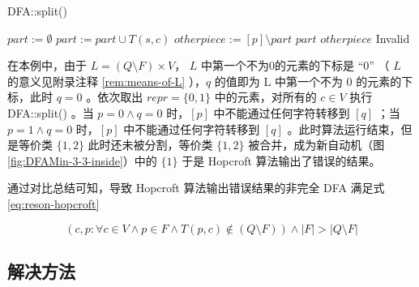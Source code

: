 \begin{algorithm}
    \caption{ DFA::split() }\label{al:split}
    \begin{algorithmic}[1]
         
            \Statex {}
            \State $part := \emptyset$ 
             
                    \State $part := part \cup T(s,c)$
                \EndIf
            \EndFor
                \State $otherpiece := [p] \setminus part$
                     {$part$}
                \Else
                     {$otherpiece$}
                \EndIf
            \Else
                 {Invalid}
            \EndIf
        \EndFunction
    \end{algorithmic}
\end{algorithm}

在本例中，由于 $L=(Q \setminus F) \times V$， $L$ 中第一个不为0的元素的下标是 “0” （ $L$ 的意义见附录注释 \ref{rem:means-of-L} ），$q$ 的值即为 L 中第一个不为 0 的元素的下标，此时 $q = 0$ 。依次取出 $repr = \{ 0,1 \}$ 中的元素，对所有的 $c \in V$ 执行 DFA::split() 。当 $p=0 \land q=0 $ 时，$[p]$ 中不能通过任何字符转移到 $[q]$ ；当 $p=1 \land q=0 $ 时，$[p]$ 中不能通过任何字符转移到 $[q]$ 。此时算法运行结束，但是等价类 $\{1,2 \}$ 此时还未被分割，等价类 $\{1,2 \}$ 被合并，成为新自动机（图 \ref{fig:DFAMin-3-3-inside}）中的 $\{ 1\}$ 于是 Hopcroft 算法输出了错误的结果。

通过对比总结可知，导致 Hopcroft 算法输出错误结果的非完全 DFA 满足式 \ref{eq:reson-hopcroft}

\begin{equation}\label{eq:reson-hopcroft} 
    (c,p: \forall c \in V \land p \in F \land T(p,c) \notin (Q\setminus F) ) \land |F| > |Q \setminus F| 
\end{equation}

\newpage
\subsection{解决方法}

